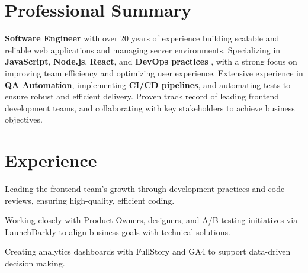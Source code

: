 \documentclass[]{main}
\begin{document}
\begin{paracol}{2}

\switchcolumn[0]


\section{Professional Summary}
\begin{minipage}{\linewidth}
   \textbf{Software Engineer} with over 20 years of experience building scalable and reliable web applications 
    and managing server environments. Specializing in \textbf{JavaScript}, \textbf{Node.js}, \textbf{React}, 
    and \textbf{DevOps practices} , with a strong focus on improving team efficiency and optimizing user 
    experience. Extensive experience in \textbf{QA Automation}, implementing \textbf{CI/CD pipelines}, and 
    automating tests to ensure robust and efficient delivery. Proven track record of leading frontend development teams, 
    and collaborating with key stakeholders to achieve business objectives. 
\end{minipage}
\sectionsep


\section{Experience}
\begin{tightemize}
    \item Leading the frontend team’s growth through development practices and code reviews, ensuring high-quality, efficient coding.
    \item Working closely with Product Owners, designers, and A/B testing initiatives via LaunchDarkly to align business goals with technical solutions.
    \item Creating analytics dashboards with FullStory and GA4 to support data-driven decision making.
\end{tightemize}
\sectionsep


\end{paracol}
\end{document}
